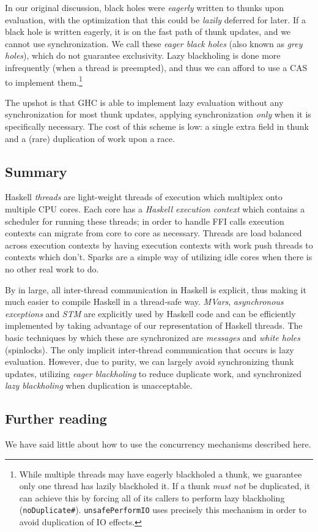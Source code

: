 In our original discussion, black holes were \emph{eagerly} written to
thunks upon evaluation, with the optimization that this could be
\emph{lazily} deferred for later.  If a black hole is written eagerly,
it is on the fast path of thunk updates, and we cannot use
synchronization.  We call these \emph{eager black holes} (also known as
\emph{grey holes}), which do not guarantee exclusivity.  Lazy blackholing is done more infrequently (when a thread is preempted), and thus
we can afford to use a CAS to implement them.\footnote{While multiple
    threads may have eagerly blackholed a thunk, we guarantee only one
    thread has lazily blackholed it.  If a thunk \emph{must not} be
duplicated, it can achieve this by forcing all of its callers to perform
lazy blackholing
(\texttt{noDuplicate\#}).  \texttt{unsafePerformIO} uses precisely
this mechanism in order to avoid duplication of IO effects.}

The upshot is that GHC is able to implement lazy evaluation without any
synchronization for most thunk updates, applying synchronization
\emph{only} when it is specifically necessary. The cost of this scheme
is low: a single extra field in thunk and a (rare) duplication of work
upon a race.

\subsection{Summary}

Haskell \emph{threads} are light-weight threads of execution which
multiplex onto multiple CPU cores.  Each core has a \emph{Haskell
execution context} which contains a scheduler for running these threads;
in order to handle FFI calls execution contexts can migrate from core to
core as necessary.  Threads are load balanced across execution contexts
by having execution contexts with work push threads to contexts which
don't.  Sparks are a simple way of utilizing idle cores when there is no
other real work to do.

By in large, all inter-thread communication in Haskell is explicit, thus
making it much easier to compile Haskell in a thread-safe way.
\emph{MVars}, \emph{asynchronous exceptions} and \emph{STM} are
explicitly used by Haskell code and can be efficiently implemented by
taking advantage of our representation of Haskell threads.  The basic
techniques by which these are synchronized are \emph{messages} and
\emph{white holes} (spinlocks).  The only implicit inter-thread
communication that occurs is lazy evaluation.  However, due to purity,
we can largely avoid synchronizing thunk updates, utilizing \emph{eager
blackholing} to reduce duplicate work, and synchronized \emph{lazy
blackholing} when duplication is unacceptable.

\subsection{Further reading}

We have said little about how to use the concurrency mechanisms described here. \XXX
